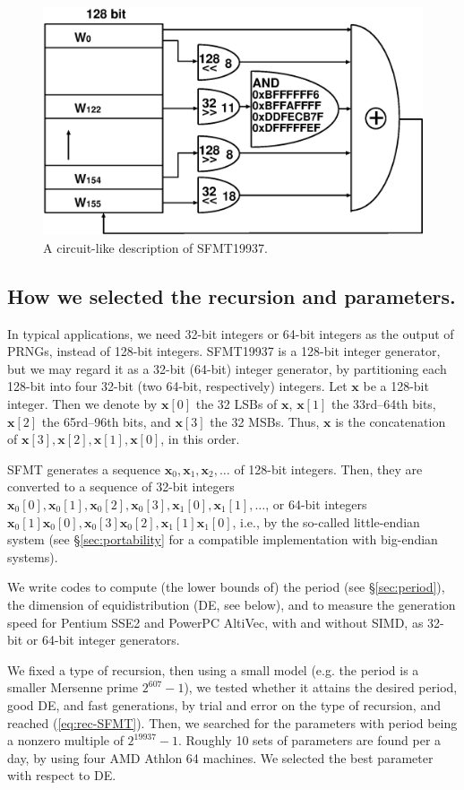 \documentclass[acmnow]{acmtrans2m}
\def\bx{{{\mathbf x}}}
\begin{document}
\begin{figure}
\begin{center}
\includegraphics[width=0.7\linewidth]{sfmt-b2.eps}
\end{center}
\caption{A circuit-like description of SFMT19937.}
\label{fig:SFMT-B2}
\end{figure}

\subsection{How we selected the recursion and parameters.}
In typical applications, we need 32-bit integers 
or 64-bit integers as the output of PRNGs, instead of 
128-bit integers.
SFMT19937 is a 128-bit integer generator, but 
we may regard it as a 32-bit (64-bit) integer generator, by
partitioning each 128-bit into four 32-bit (two 64-bit, respectively)
integers. 
Let $\bx$ be a 128-bit integer. Then we denote
by 
$\bx[0]$ the 32 LSBs of $\bx$, 
$\bx[1]$ the 33rd--64th bits,
$\bx[2]$ the 65rd--96th bits,
and $\bx[3]$ the 32 MSBs. Thus, $\bx$ is
the concatenation of 
$\bx[3], \bx[2], \bx[1], \bx[0]$, in this order.

SFMT generates a sequence
$\bx_0, \bx_1, \bx_2, \ldots$ of 128-bit integers. 
Then, they are converted to a sequence of 32-bit integers
$\bx_0[0], \bx_0[1], \bx_0[2], \bx_0[3], \bx_1[0], \bx_1[1],\ldots$,
or 64-bit integers
$\bx_0[1]\bx_0[0], \bx_0[3]\bx_0[2], \bx_1[1]\bx_1[0]$,
i.e., by the so-called little-endian system 
(see \S\ref{sec:portability} for a compatible implementation
 with big-endian systems).

We write codes to compute (the lower bounds of) the period
(see \S\ref{sec:period}),
the dimension of equidistribution (DE, see below),
and to measure the generation speed for Pentium SSE2
and PowerPC AltiVec, with and without SIMD, as 32-bit 
or 64-bit integer generators. 

We fixed a type of recursion,
then using a small model (e.g. the period is a smaller
Mersenne prime $2^{607}-1$), we tested whether it
attains the desired period, good DE, and fast generations,
by trial and error on the type of recursion, 
and reached (\ref{eq:rec-SFMT}).
Then, we searched for the parameters 
with period being a nonzero multiple of $2^{19937}-1$. 
Roughly 10 sets of parameters are found per a day,
by using four AMD Athlon 64 machines. 
We selected the best parameter with respect to DE.
\end{document}
